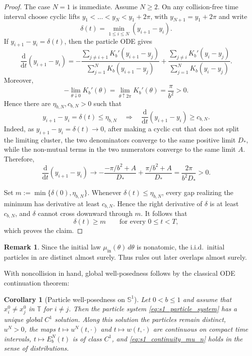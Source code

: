 \documentclass[11pt]{article}
\newtheorem{corollary}[theorem]{Corollary}
\theoremstyle{definition}
\newtheorem{remark}[theorem]{Remark}
\newcommand{\Sphere}{\mathbb{S}}
\newcommand{\Torus}{\mathbb{T}}
\begin{document}
\begin{proof}
The case $N=1$ is immediate. Assume $N\ge2$. On any collision-free time interval
choose cyclic lifts $y_1<\dots<y_N<y_1+2\pi$, with $y_{N+1}=y_1+2\pi$
and write
\[
\delta(t)=\min_{1\le i\le N}(y_{i+1}-y_i).
\]
If $y_{i+1}-y_i=\delta(t)$, then the particle ODE gives
\[
\frac{\mathrm d}{\mathrm dt}(y_{i+1}-y_i)
=
-\frac{\sum_{j\ne i+1} K_b'(y_{i+1}-y_j)}
        {\sum_{j=1}^N K_b(y_{i+1}-y_j)}
+
\frac{\sum_{j\ne i} K_b'(y_i-y_j)}
        {\sum_{j=1}^N K_b(y_i-y_j)}.
\]
Moreover,
\[
-\lim_{\theta\downarrow0}K_b'(\theta)
=
\lim_{\theta\uparrow2\pi}K_b'(\theta)
=
\frac{\pi}{b^2}>0.
\]
Hence there are $\eta_{b,N},c_{b,N}>0$ such that
\[
y_{i+1}-y_i=\delta(t)\le\eta_{b,N}
\quad\Longrightarrow\quad
\frac{\mathrm d}{\mathrm dt}(y_{i+1}-y_i)\ge c_{b,N}.
\]
Indeed, as $y_{i+1}-y_i=\delta(t)\to0$, after making a cyclic cut that does
not split the limiting cluster, the two denominators converge to the same
positive limit $D_\ast$, while the non-mutual terms in the two numerators
converge to the same limit $A$. Therefore,
\[
\frac{\mathrm d}{\mathrm dt}(y_{i+1}-y_i)
\longrightarrow
-\frac{-\pi/b^2+A}{D_\ast}
+\frac{\pi/b^2+A}{D_\ast}
=
\frac{2\pi}{b^2D_\ast}>0.
\]

Set $m:=\min\{\delta(0),\eta_{b,N}\}$. Whenever $\delta(t)\le\eta_{b,N}$, every gap realizing the minimum has
derivative at least $c_{b,N}$. Hence the right derivative of $\delta$ is at
least $c_{b,N}$, and $\delta$ cannot cross downward through $m$. It follows
that
\[
\delta(t)\ge m
\qquad\text{for every }0\le t<T,
\]
which proves the claim.
\end{proof}

\begin{remark}
Since the initial law $\mu_{\mathrm{in}}(\theta)\,d\theta$ is nonatomic, the i.i.d.\
initial particles in  are distinct almost surely.
Thus \Cref{lem:s1_noncollision} rules out later overlaps almost surely.
\end{remark}

With noncollision in hand, global well-posedness follows by the classical ODE continuation theorem:

\begin{corollary}[Particle well-posedness on $\Sphere^1$]\label{prop:s1_particle_wellposed}
Let $0<b\le1$ and assume that $x_i^0\ne x_j^0$ in $\Torus$ for $i\ne j$.
Then the particle system \eqref{eq:s1_particle_system} has a unique global
$C^1$ solution. Along this solution the particles remain distinct,
$u^N>0$, the maps $t\mapsto u^N(t,\cdot)$ and $t\mapsto w(t,\cdot)$ are
continuous on compact time intervals, $t\mapsto E^N_b(t)$ is of class $C^1$,
and \eqref{eq:s1_continuity_mu_n} holds in the sense of distributions.
\end{corollary}
\end{document}
